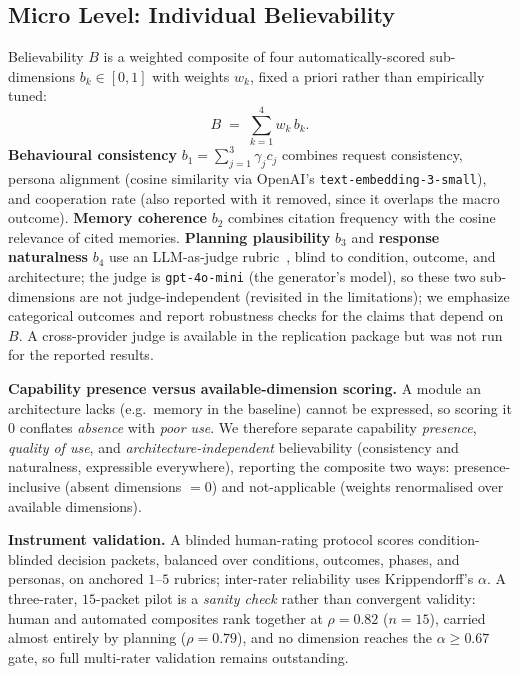 \documentclass[runningheads]{llncs}
\begin{document}
\subsection{Micro Level: Individual Believability}\label{sec:micro}
Believability $B$ is a weighted composite of four automatically-scored sub-dimensions
$b_k\in[0,1]$ with weights $w_k$, fixed a priori rather than empirically tuned:
\begin{equation}\label{eq:believability}
B \;=\; \sum_{k=1}^{4} w_k\, b_k .
\end{equation}
\textbf{Behavioural consistency} $b_1=\sum_{j=1}^{3}\gamma_j c_j$ combines request consistency,
persona alignment (cosine similarity via OpenAI's \texttt{text-embedding-3-small}), and
cooperation rate (also reported with it removed, since it overlaps the macro outcome).
\textbf{Memory coherence} $b_2$ combines citation frequency with the cosine relevance of cited
memories. \textbf{Planning plausibility} $b_3$ and \textbf{response naturalness} $b_4$ use an
LLM-as-judge rubric~\cite{zheng2023judging,pan2025agentrewardbench}, blind to condition, outcome,
and architecture; the judge is \texttt{gpt-4o-mini} (the generator's model), so these two
sub-dimensions are not judge-independent (revisited in the limitations); we emphasize categorical
outcomes and report robustness checks for the claims that depend on $B$. A cross-provider judge is
available in the replication package but was not run for the reported results.

\textbf{Capability presence versus available-dimension scoring.} A module an architecture lacks
(e.g.\ memory in the baseline) cannot be expressed, so scoring it $0$ conflates \emph{absence} with
\emph{poor use}. We therefore separate capability \emph{presence}, \emph{quality of use}, and
\emph{architecture-independent} believability (consistency and naturalness, expressible
everywhere), reporting the composite two ways: presence-inclusive (absent dimensions $=0$) and
not-applicable (weights renormalised over available dimensions).

\textbf{Instrument validation.} A blinded human-rating protocol scores condition-blinded decision
packets, balanced over conditions, outcomes, phases, and personas, on anchored $1$--$5$ rubrics;
inter-rater reliability uses Krippendorff's $\alpha$. A three-rater, $15$-packet pilot is a
\emph{sanity check} rather than convergent validity: human and automated composites rank together at
$\rho=0.82$ ($n=15$), carried almost entirely by planning ($\rho=0.79$), and no dimension reaches
the $\alpha\geq0.67$ gate, so full multi-rater validation remains outstanding.
\end{document}
